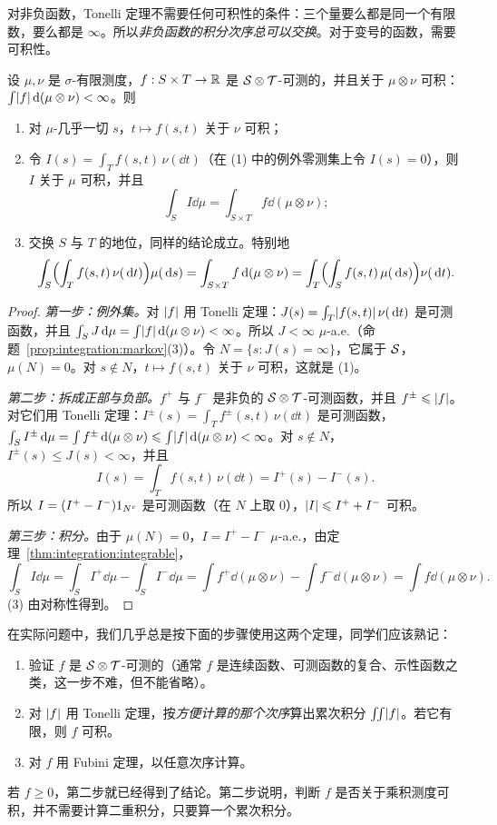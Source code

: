 对非负函数，Tonelli 定理不需要任何可积性的条件：三个量要么都是同一个有限数，要么都是 $\infty$。所以\emph{非负函数的积分次序总可以交换}。对于变号的函数，需要可积性。

\begin{theorem}[Fubini 定理]\label{thm:product:fubini}
设 $\mu,\nu$ 是 $\sigma$-有限测度，$f:S\times T\to\mathbb{R}$ 是 $\mathcal{S}\otimes\mathcal{T}$-可测的，并且关于 $\mu\otimes\nu$ 可积：$\int\lvert f\rvert\,\mathrm{d}(\mu\otimes\nu)<\infty$。则
\begin{enumerate}
\item 对 $\mu$-几乎一切 $s$，$t\mapsto f(s,t)$ 关于 $\nu$ 可积；
\item 令 $I(s)=\int_Tf(s,t)\,\nu(\dd t)$（在 (1) 中的例外零测集上令 $I(s)=0$），则 $I$ 关于 $\mu$ 可积，并且
\[
\int_SI\dd\mu=\int_{S\times T}f\dd(\mu\otimes\nu);
\]
\item 交换 $S$ 与 $T$ 的地位，同样的结论成立。特别地
\[
\int_S\Bigl(\int_Tf(s,t)\,\nu(\,\mathrm{d} t)\Bigr)\mu(\,\mathrm{d} s)=\int_{S\times T}f\,\mathrm{d}(\mu\otimes\nu)=\int_T\Bigl(\int_Sf(s,t)\,\mu(\,\mathrm{d} s)\Bigr)\nu(\,\mathrm{d} t).
\]
\end{enumerate}
\end{theorem}
\begin{proof}
\emph{第一步：例外集。}对 $\lvert f\rvert$ 用 Tonelli 定理：$J(s)=\int_T\lvert f(s,t)\rvert\,\nu(\,\mathrm{d} t)$ 是可测函数，并且 $\int_SJ\,\mathrm{d}\mu=\int\lvert f\rvert\,\mathrm{d}(\mu\otimes\nu)<\infty$。所以 $J<\infty$ $\mu$-a.e.（命题~\ref{prop:integration:markov}(3)）。令 $N=\{s:J(s)=\infty\}$，它属于 $\mathcal{S}$，$\mu(N)=0$。对 $s\notin N$，$t\mapsto f(s,t)$ 关于 $\nu$ 可积，这就是 (1)。

\emph{第二步：拆成正部与负部。}$f^+$ 与 $f^-$ 是非负的 $\mathcal{S}\otimes\mathcal{T}$-可测函数，并且 $f^\pm\leqslant\lvert f\rvert$。对它们用 Tonelli 定理：$I^\pm(s)=\int_Tf^\pm(s,t)\,\nu(\dd t)$ 是可测函数，$\int_SI^\pm\,\mathrm{d}\mu=\int f^\pm\,\mathrm{d}(\mu\otimes\nu)\leqslant\int\lvert f\rvert\,\mathrm{d}(\mu\otimes\nu)<\infty$。对 $s\notin N$，$I^\pm(s)\leqslant J(s)<\infty$，并且
\[
I(s)=\int_Tf(s,t)\,\nu(\dd t)=I^+(s)-I^-(s).
\]
所以 $I=(I^+-I^-)1_{N^c}$ 是可测函数（在 $N$ 上取 $0$），$\lvert I\rvert\leqslant I^++I^-$ 可积。

\emph{第三步：积分。}由于 $\mu(N)=0$，$I=I^+-I^-$ $\mu$-a.e.，由定理~\ref{thm:integration:integrable}，
\[
\int_SI\dd\mu=\int_SI^+\dd\mu-\int_SI^-\dd\mu=\int f^+\dd(\mu\otimes\nu)-\int f^-\dd(\mu\otimes\nu)=\int f\dd(\mu\otimes\nu).
\]
(3) 由对称性得到。
\end{proof}

\begin{remark}
在实际问题中，我们几乎总是按下面的步骤使用这两个定理，同学们应该熟记：
\begin{enumerate}
\item 验证 $f$ 是 $\mathcal{S}\otimes\mathcal{T}$-可测的（通常 $f$ 是连续函数、可测函数的复合、示性函数之类，这一步不难，但不能省略）。
\item 对 $\lvert f\rvert$ 用 Tonelli 定理，按\emph{方便计算的那个次序}算出累次积分 $\int\!\!\int\lvert f\rvert$。若它有限，则 $f$ 可积。
\item 对 $f$ 用 Fubini 定理，以任意次序计算。
\end{enumerate}
若 $f\geqslant0$，第二步就已经得到了结论。第二步说明，判断 $f$ 是否关于乘积测度可积，并不需要计算二重积分，只要算一个累次积分。
\end{remark}


